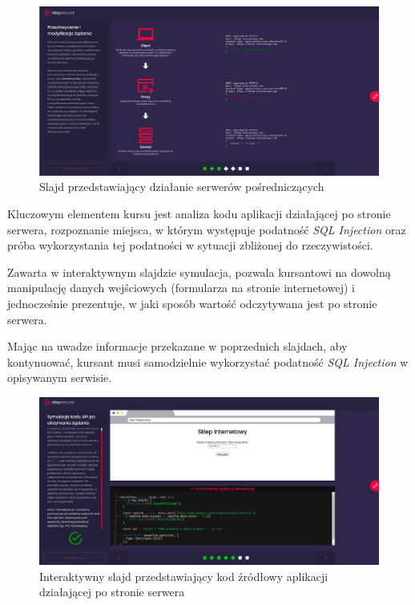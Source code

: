 \documentclass[12pt,twoside]{article}
\begin{document}
\begin{figure}[H]
	\centering
	\includegraphics[width=1\linewidth]{figures/sql-slide-screenshot3.png}
	\caption{Slajd przedstawiający działanie serwerów pośredniczących}
	\label{Fig:Interaktywny slajd przedstawiający budowę omawianej strony}
\end{figure} 

Kluczowym elementem kursu jest analiza kodu aplikacji działającej po stronie serwera, rozpoznanie miejsca, w którym występuje podatność \emph{SQL Injection} oraz próba wykorzystania tej podatności w sytuacji zbliżonej do rzeczywistości.

Zawarta w interaktywnym slajdzie symulacja, pozwala kursantowi na dowolną manipulację danych wejściowych (formularza na stronie internetowej) i jednocześnie prezentuje, w jaki sposób wartość odczytywana jest po stronie serwera. 

Mając na uwadze informacje przekazane w poprzednich slajdach, aby kontynuować, kursant musi samodzielnie wykorzystać podatność \emph{SQL Injection} w opisywanym serwisie.
 
 \begin{figure}[H]
 	\centering
 	\includegraphics[width=1\linewidth]{figures/sql-slide-screenshot2.png}
 	\caption{Interaktywny slajd przedstawiający kod źródłowy aplikacji działającej po stronie serwera}
 \end{figure} 
 
\end{document}
